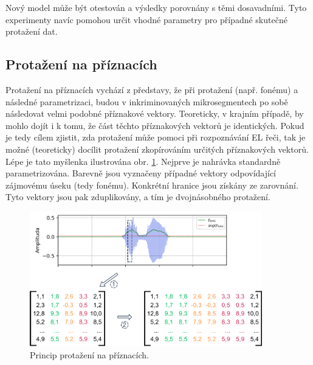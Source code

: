 \noindent Nový model může být otestován a výsledky porovnány s těmi dosavadními. Tyto experimenty navíc pomohou určit vhodné parametry pro případné skutečné protažení dat.


\subsection{Protažení na příznacích}
\label{chap:realisation:augmentation:features}

Protažení na příznacích vychází z představy, že při protažení (např. fonému) a následné parametrizaci, budou v inkriminovaných mikrosegmentech po sobě následovat velmi podobné příznakové vektory.
Teoreticky, v krajním případě, by mohlo dojít i k tomu, že část těchto příznakových vektorů je identických. Pokud je tedy cílem zjistit, zda protažení může pomoci při rozpoznávání EL řeči, tak je možné (teoreticky) docílit protažení zkopírováním určitých příznakových vektorů.
Lépe je tato myšlenka ilustrována obr. \ref{fig:realisation:augmentation:features}. Nejprve je nahrávka standardně parametrizována. Barevně jsou vyznačeny případné vektory odpovídající zájmovému úseku (tedy fonému). Konkrétní hranice jsou získány ze zarovnání. Tyto vektory jsou pak zduplikovány, a tím je  dvojnásobného protažení.

\begin{figure}[hbpt]
  \centering
  \includegraphics[width=0.9\textwidth]{./ch5-construction/img/augmentation_features.pdf}
  \caption{Princip protažení na příznacích.}
  \label{fig:realisation:augmentation:features}
\end{figure}

